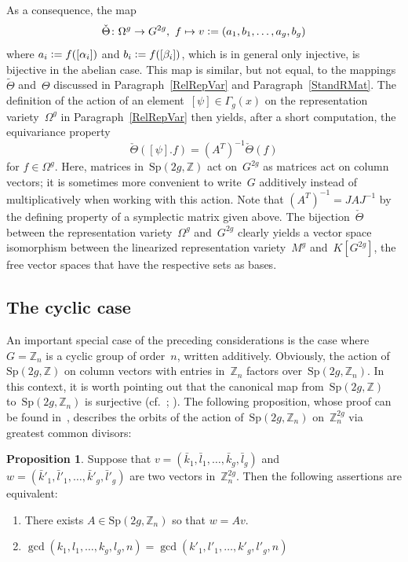 \documentclass[12pt]{article}
\newcounter{num}
\theoremstyle{definition}
\newtheorem{Proposition}[Satz]{Proposition}
\theoremstyle{break}
\newcommand{\Z}{\mathbb{Z}}
\newcommand{\Sp}{\mathrm{Sp}}
\renewcommand{\1}{\mathbbm{1}}
\newcommand{\deq}{\vcentcolon =}
\begin{document}
As a consequence, the map
\[\check{\Theta} \colon \Omega^g \to G^{2g},~f \mapsto v \deq (a_1,b_1,\dots,a_g,b_g)\]
where $a_i \deq f([\alpha_i])$ and $b_i \deq f([\beta_i])$, which is in general only injective, is bijective in the abelian case. This map is similar, but not equal, to the mappings~$\tilde{\Theta}$ and~$\Theta$ discussed in Paragraph~\ref{RelRepVar} and Paragraph~\ref{StandRMat}. The definition of the action of an element~$[\psi] \in \Gamma_g(x)$ on the representation variety~$\Omega^g$ in Paragraph~\ref{RelRepVar} then yields, after a short computation, the equivariance property
\[\check{\Theta}([\psi].f) = (A^T)^{-1} \check{\Theta}(f)\]
for $f \in \Omega^g$. Here, matrices in~$\Sp(2g, \Z)$ act on~$G^{2g}$ as matrices act on column vectors; it is sometimes more convenient to write~$G$ additively instead of multiplicatively when working with this action. Note that $(A^T)^{-1} = J A J^{-1}$ by the defining property of a symplectic matrix given above.
The bijection~$\check{\Theta}$ between the representation variety~$\Omega^g$ and~$G^{2g}$ clearly yields a vector space isomorphism between the linearized representation variety~$M^g$ and~$K[G^{2g}]$, the free vector spaces that have the respective sets as bases.


\subsection{The cyclic case} \label{Cycl}
An important special case of the preceding considerations is the case where $G=\Z_n$ is a cyclic group of order~$n$, written additively. Obviously, the action of~$\Sp(2g, \Z)$ on column vectors with entries in~$\Z_n$ factors over~$\Sp(2g, \Z_n)$. In this context, it is worth pointing out that the canonical map from~$\Sp(2g, \Z)$ to~$\Sp(2g, \Z_n)$ is surjective (cf.~\cite[Thm.~1, p.~85]{NS}; \cite[Thm.~VII.21, p.~132]{N}). The following proposition, whose proof can be found in~\cite[Thm.~3.5, p.~18]{FF}, describes the orbits of the action of~$\Sp(2g, \Z_n)$
on~$\Z_n^{2g}$ via greatest common divisors:
\begin{Proposition} \label{SymplOrb}
Suppose that $v = (\bar{k}_1, \bar{l}_1,\ldots, \bar{k}_g, \bar{l}_g)$
and $w = (\bar{k}'_1, \bar{l}'_1,\ldots, \bar{k}'_g, \bar{l}'_g)$ are two vectors in~$\Z_n^{2g}$. Then the following assertions are equivalent:
\begin{enumerate}
\item
There exists $A \in \Sp(2g, \Z_n)$ so that $w = Av$.

\item
$\gcd(k_1, l_1,\ldots, k_g, l_g,n) = \gcd(k'_1, l'_1,\ldots, k'_g, l'_g,n)$
\end{enumerate}
\end{Proposition}
\end{document}
